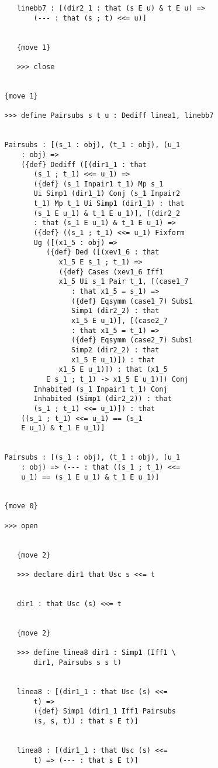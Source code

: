 \documentclass[12pt]{article}
\begin{document}
\begin{verbatim}
      linebb7 : [(dir2_1 : that (s E u) & t E u) => 
          (--- : that (s ; t) <<= u)]


      {move 1}

      >>> close


   {move 1}

   >>> define Pairsubs s t u : Dediff linea1, linebb7


   Pairsubs : [(s_1 : obj), (t_1 : obj), (u_1 
       : obj) => 
       ({def} Dediff ([(dir1_1 : that 
          (s_1 ; t_1) <<= u_1) => 
          ({def} (s_1 Inpair1 t_1) Mp s_1 
          Ui Simp1 (dir1_1) Conj (s_1 Inpair2 
          t_1) Mp t_1 Ui Simp1 (dir1_1) : that 
          (s_1 E u_1) & t_1 E u_1)], [(dir2_2 
          : that (s_1 E u_1) & t_1 E u_1) => 
          ({def} ((s_1 ; t_1) <<= u_1) Fixform 
          Ug ([(x1_5 : obj) => 
             ({def} Ded ([(xev1_6 : that 
                x1_5 E s_1 ; t_1) => 
                ({def} Cases (xev1_6 Iff1 
                x1_5 Ui s_1 Pair t_1, [(case1_7 
                   : that x1_5 = s_1) => 
                   ({def} Eqsymm (case1_7) Subs1 
                   Simp1 (dir2_2) : that 
                   x1_5 E u_1)], [(case2_7 
                   : that x1_5 = t_1) => 
                   ({def} Eqsymm (case2_7) Subs1 
                   Simp2 (dir2_2) : that 
                   x1_5 E u_1)]) : that 
                x1_5 E u_1)]) : that (x1_5 
             E s_1 ; t_1) -> x1_5 E u_1)]) Conj 
          Inhabited (s_1 Inpair1 t_1) Conj 
          Inhabited (Simp1 (dir2_2)) : that 
          (s_1 ; t_1) <<= u_1)]) : that 
       ((s_1 ; t_1) <<= u_1) == (s_1 
       E u_1) & t_1 E u_1)]


   Pairsubs : [(s_1 : obj), (t_1 : obj), (u_1 
       : obj) => (--- : that ((s_1 ; t_1) <<= 
       u_1) == (s_1 E u_1) & t_1 E u_1)]


   {move 0}

   >>> open


      {move 2}

      >>> declare dir1 that Usc s <<= t


      dir1 : that Usc (s) <<= t


      {move 2}

      >>> define linea8 dir1 : Simp1 (Iff1 \
          dir1, Pairsubs s s t)


      linea8 : [(dir1_1 : that Usc (s) <<= 
          t) => 
          ({def} Simp1 (dir1_1 Iff1 Pairsubs 
          (s, s, t)) : that s E t)]


      linea8 : [(dir1_1 : that Usc (s) <<= 
          t) => (--- : that s E t)]



\end{verbatim}
\end{document}
